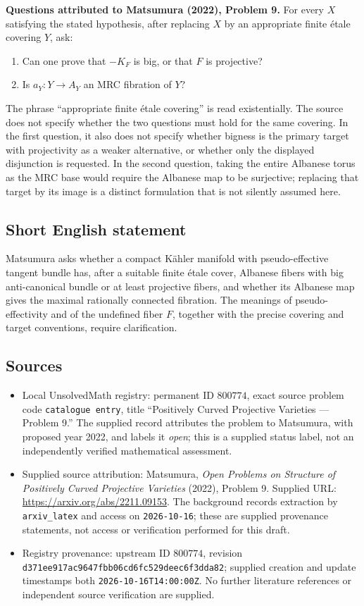 \documentclass[11pt]{article}
\begin{document}
\textbf{Questions attributed to Matsumura (2022), Problem 9.} For every \(X\) satisfying the stated hypothesis, after replacing \(X\) by an appropriate finite \'etale covering \(Y\), ask:
\begin{enumerate}
\item Can one prove that \(-K_F\) is big, or that \(F\) is projective?
\item Is \(a_Y:Y\to A_Y\) an MRC fibration of \(Y\)?
\end{enumerate}
The phrase ``appropriate finite \'etale covering'' is read existentially. The source does not specify whether the two questions must hold for the same covering. In the first question, it also does not specify whether bigness is the primary target with projectivity as a weaker alternative, or whether only the displayed disjunction is requested. In the second question, taking the entire Albanese torus as the MRC base would require the Albanese map to be surjective; replacing that target by its image is a distinct formulation that is not silently assumed here.
\subsection{Short English statement}
Matsumura asks whether a compact K\"ahler manifold with pseudo-effective tangent bundle has, after a suitable finite \'etale cover, Albanese fibers with big anti-canonical bundle or at least projective fibers, and whether its Albanese map gives the maximal rationally connected fibration. The meanings of pseudo-effectivity and of the undefined fiber \(F\), together with the precise covering and target conventions, require clarification.
\subsection{Sources}
\begin{itemize}
\item Local UnsolvedMath registry: permanent ID \(800774\), exact source problem code \texttt{catalogue entry}, title ``Positively Curved Projective Varieties --- Problem 9.'' The supplied record attributes the problem to Matsumura, with proposed year 2022, and labels it \emph{open}; this is a supplied status label, not an independently verified mathematical assessment.
\item Supplied source attribution: Matsumura, \emph{Open Problems on Structure of Positively Curved Projective Varieties} (2022), Problem 9. Supplied URL: \url{https://arxiv.org/abs/2211.09153}. The background records extraction by \texttt{arxiv\_latex} and access on \texttt{2026-10-16}; these are supplied provenance statements, not access or verification performed for this draft.
\item Registry provenance: upstream ID \(800774\), revision \texttt{d371ee917ac9647fbb06cd6fc529deec6f3dda82}; supplied creation and update timestamps both \texttt{2026-10-16T14:00:00Z}. No further literature references or independent source verification are supplied.
\end{itemize}
\end{document}
